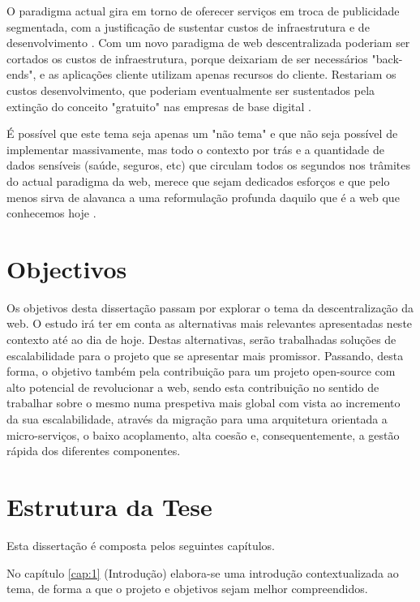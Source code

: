 O paradigma actual gira em torno de oferecer serviços em troca de publicidade segmentada, com a justificação de sustentar custos de infraestrutura e de desenvolvimento \cite{top_three_issues_centralized_web}. Com um novo paradigma de web descentralizada poderiam ser cortados os custos de infraestrutura, porque deixariam de ser necessários "back-ends", e as aplicações cliente utilizam apenas recursos do cliente. Restariam os custos desenvolvimento, que poderiam eventualmente ser sustentados pela extinção do conceito "gratuito" nas empresas de base digital \cite{why_web_decentralization_future}.

É possível que este tema seja apenas um "não tema" e que não seja possível de implementar massivamente, mas todo o contexto por trás e a quantidade de dados sensíveis (saúde, seguros, etc) que circulam todos os segundos nos trâmites do actual paradigma da web,
merece que sejam dedicados esforços e que pelo menos sirva de alavanca a uma reformulação profunda daquilo que é a web que conhecemos hoje \cite{why_web_decentralization_future}.

\section{Objectivos}
Os objetivos desta dissertação passam por explorar o tema da descentralização da web. O estudo irá ter em conta as alternativas mais relevantes apresentadas neste contexto até ao dia de hoje. Destas alternativas, serão trabalhadas soluções de escalabilidade para o projeto que se apresentar mais promissor.
Passando, desta forma, o objetivo também pela contribuição para um projeto open-source com alto potencial de revolucionar a web, sendo esta contribuição no sentido de trabalhar sobre o mesmo numa prespetiva mais global com vista ao incremento da sua escalabilidade, através da migração para uma arquitetura orientada a micro-serviços, o baixo acoplamento, alta coesão e, consequentemente, a gestão rápida dos diferentes componentes.

\section{Estrutura da Tese}

Esta dissertação é composta pelos seguintes capítulos.

No capítulo \ref{cap:1} (Introdução) elabora-se uma introdução contextualizada ao tema, de forma a que o projeto e objetivos sejam melhor compreendidos.

